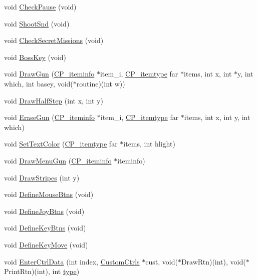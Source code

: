 \begin{DoxyCompactItemize}
\item 
void \hyperlink{WL__MENU_8H_a091147f2346aaad8a89508a27b711c3f}{CheckPause} (void)
\item 
void \hyperlink{WL__MENU_8H_a5dd49cf82c780b8d761f20d9af4771e9}{ShootSnd} (void)
\item 
void \hyperlink{WL__MENU_8H_adf80f60f97a1eae5b762f0d7234be326}{CheckSecretMissions} (void)
\item 
void \hyperlink{WL__MENU_8H_a39a54ce56d7e78076c8a5f6c12355814}{BossKey} (void)
\item 
void \hyperlink{WL__MENU_8H_aa2214b22585686a8992038d77d4dbd3c}{DrawGun} (\hyperlink{structCP__iteminfo}{CP\_\-iteminfo} $\ast$item\_\-i, \hyperlink{structCP__itemtype}{CP\_\-itemtype} far $\ast$items, int x, int $\ast$y, int which, int basey, void($\ast$routine)(int w))
\item 
void \hyperlink{WL__MENU_8H_ad838539ffa52a66afa3fc9d4ce9bef29}{DrawHalfStep} (int x, int y)
\item 
void \hyperlink{WL__MENU_8H_ac0d2328b065d28f9db037264a780fab4}{EraseGun} (\hyperlink{structCP__iteminfo}{CP\_\-iteminfo} $\ast$item\_\-i, \hyperlink{structCP__itemtype}{CP\_\-itemtype} far $\ast$items, int x, int y, int which)
\item 
void \hyperlink{WL__MENU_8H_a604ee41d936e798d09c96e1e0895a983}{SetTextColor} (\hyperlink{structCP__itemtype}{CP\_\-itemtype} far $\ast$items, int hlight)
\item 
void \hyperlink{WL__MENU_8H_a90a65e74d80272f0305d2537870c10ef}{DrawMenuGun} (\hyperlink{structCP__iteminfo}{CP\_\-iteminfo} $\ast$iteminfo)
\item 
void \hyperlink{WL__MENU_8H_a81a9dfc7b2dab1a015d6be0c329e094b}{DrawStripes} (int y)
\item 
void \hyperlink{WL__MENU_8H_af9ffcf08793f2da25a6f54f439e15ddf}{DefineMouseBtns} (void)
\item 
void \hyperlink{WL__MENU_8H_a0a00df1716b0a174dc25901d829aea93}{DefineJoyBtns} (void)
\item 
void \hyperlink{WL__MENU_8H_a6f23a62131fda11af6f0aa3002bdfffb}{DefineKeyBtns} (void)
\item 
void \hyperlink{WL__MENU_8H_a666771efec8f7ee7f225adda60c1f5e0}{DefineKeyMove} (void)
\item 
void \hyperlink{WL__MENU_8H_a94d0412c951284a8ea98378116c23566}{EnterCtrlData} (int index, \hyperlink{structCustomCtrls}{CustomCtrls} $\ast$cust, void($\ast$DrawRtn)(int), void($\ast$PrintRtn)(int), int \hyperlink{WL__ACT1_8C_ac6913ebc2a188919d185cadc155a48cd}{type})

\end{DoxyCompactItemize}
